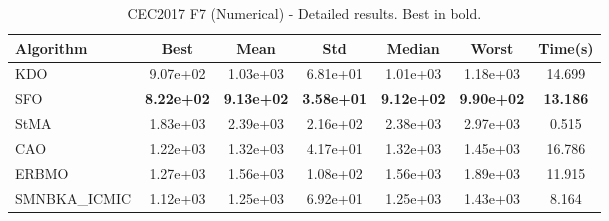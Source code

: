 \begin{table}[H]
\centering\small
\caption{CEC2017 F7 (Numerical) - Detailed results. Best in bold.}
\label{tab:cec2017_F7}
\begin{tabular}{lcccccc}
\toprule
\textbf{Algorithm} & \textbf{Best} & \textbf{Mean} & \textbf{Std} & \textbf{Median} & \textbf{Worst} & \textbf{Time(s)} \\
\midrule
KDO & 9.07e+02 & 1.03e+03 & 6.81e+01 & 1.01e+03 & 1.18e+03 & 14.699 \\
SFO & \textbf{8.22e+02} & \textbf{9.13e+02} & \textbf{3.58e+01} & \textbf{9.12e+02} & \textbf{9.90e+02} & \textbf{13.186} \\
StMA & 1.83e+03 & 2.39e+03 & 2.16e+02 & 2.38e+03 & 2.97e+03 & 0.515 \\
CAO & 1.22e+03 & 1.32e+03 & 4.17e+01 & 1.32e+03 & 1.45e+03 & 16.786 \\
ERBMO & 1.27e+03 & 1.56e+03 & 1.08e+02 & 1.56e+03 & 1.89e+03 & 11.915 \\
SMNBKA_ICMIC & 1.12e+03 & 1.25e+03 & 6.92e+01 & 1.25e+03 & 1.43e+03 & 8.164 \\
\bottomrule
\end{tabular}
\end{table}
